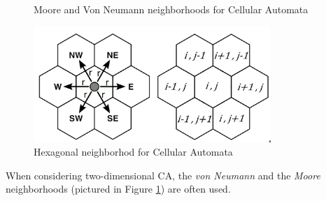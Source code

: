 \begin{figure}
  \centering
  \hspace{1cm}%
  \caption{Moore and Von Neumann neighborhoods for Cellular Automata}
  \label{fig:2d_n}
\end{figure}

\begin{figure}
  \centering
    \includegraphics[width=0.8\textwidth]{hex_n}%
    
  \caption{Hexagonal neighborhod for Cellular Automata\cite{hex_phy}}
  \label{fig:hex_n}
\end{figure}

When considering two-dimensional CA, the \textit{von Neumann} and the \textit{Moore} neighborhoods (pictured in Figure \ref{fig:2d_n}) are often used.

